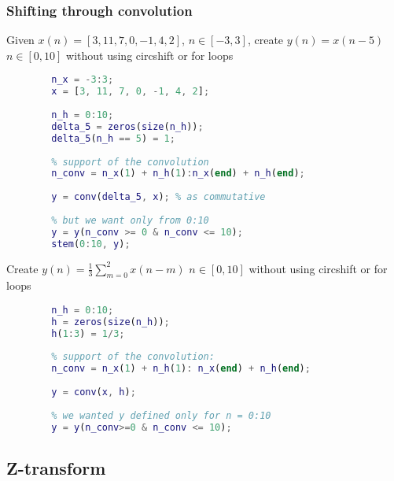     \subsubsection{Shifting through convolution}
    Given $x(n)=[3,11,7,0,-1,4,2]$, $n\in[-3,3]$, create $y(n)=x(n-5)$ $n\in[0,10]$ without using circshift or for loops
    \begin{lstlisting}[language=Matlab, escapeinside=`']
        % y(n)=x(n-5)=x(n)*\delta(n-5)
        n_x = -3:3;
        x = [3, 11, 7, 0, -1, 4, 2];
        
        n_h = 0:10;
        delta_5 = zeros(size(n_h));
        delta_5(n_h == 5) = 1;
        
        % support of the convolution
        n_conv = n_x(1) + n_h(1):n_x(end) + n_h(end);
        
        y = conv(delta_5, x); % as commutative
        
        % but we want only from 0:10
        y = y(n_conv >= 0 & n_conv <= 10);
        stem(0:10, y);
    \end{lstlisting}
    Create $y(n)=\frac{1}{3}\sum_{m=0}^2x(n-m)$ $n\in[0,10]$ without using circshift or for loops
    \begin{lstlisting}[language=Matlab, escapeinside=`']
        % define the filter, which is 1/3 (delta(n) + delta(n-1) + delta(n-2))
        n_h = 0:10;
        h = zeros(size(n_h));
        h(1:3) = 1/3;
        
        % support of the convolution:
        n_conv = n_x(1) + n_h(1): n_x(end) + n_h(end);
        
        y = conv(x, h);
        
        % we wanted y defined only for n = 0:10 
        y = y(n_conv>=0 & n_conv <= 10);
    \end{lstlisting}

\pagebreak\subsection{Z-transform}

